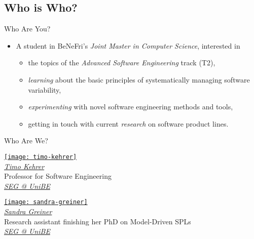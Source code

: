 \subsection{Who is Who?}

\begin{frame}{\myframetitle}
	\begin{fancycolumns}
		\begin{example}{Who Are You?}
			\begin{itemize}
				\item A student in BeNeFri's \emph{Joint Master in Computer Science}, interested in
				\begin{itemize}
					\item the topics of the \emph{Advanced Software Engineering} track (T2),
					\item \emph{learning} about the basic principles of systematically managing software variability,
					\item \emph{experimenting} with novel software engineering methods and tools,
					\item getting in touch with current \emph{research} on software product lines.
				\end{itemize}
			\end{itemize}
		\end{example}
	\nextcolumn
		\begin{note}{Who Are We?}
			\centering
			\parbox{0.45\linewidth}{
				\centering
				\href{https://seg.inf.unibe.ch/people/timo/}{\texttt{[image: timo-kehrer]}}\\[.5ex]
				\href{https://seg.inf.unibe.ch/people/timo/}{\emph{Timo Kehrer}}\\[.5ex]
				\small Professor for Software Engineering \\[.5ex]
				\href{https://seg.inf.unibe.ch/}{\small \emph{SEG @ UniBE}}
			}
			\parbox{0.45\linewidth}{
				\centering
				\href{https://seg.inf.unibe.ch/people/sandra/}{\texttt{[image: sandra-greiner]}}\\[.5ex]
				\href{https://seg.inf.unibe.ch/people/sandra/}{\emph{Sandra Greiner}}\\[.5ex]
				\small Research assistant finishing her PhD on Model-Driven SPLs \\[.5ex]
				\href{https://seg.inf.unibe.ch/}{\small \emph{SEG @ UniBE}}
			}
		\end{note}
	\end{fancycolumns}
\end{frame}

